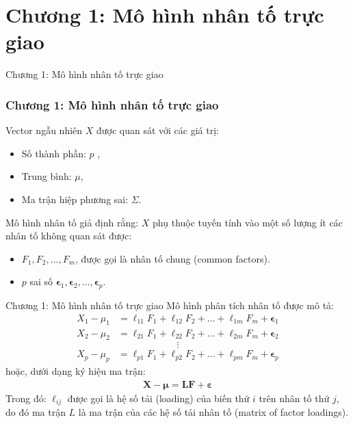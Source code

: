 \section{Chương 1: Mô hình nhân tố trực giao}
\begin{frame}{Chương 1: Mô hình nhân tố trực giao}
\frametitle{Chương 1: Mô hình nhân tố trực giao}
Vector ngẫu nhiên \(X\) được quan sát với các giá trị:
\begin{itemize}[label={-}]
\item Số thành phần: \(p\) ,
\item Trung bình: \(\mu\),
\item Ma trận hiệp phương sai: \(\Sigma\).
\end{itemize}

Mô hình nhân tố giả định rằng: \(X\) phụ thuộc tuyến tính vào một số lượng ít các nhân tố không quan sát được:
\begin{itemize}[label={-}]
\item \(F_1, F_2, \ldots, F_m\), được gọi là nhân tố chung (common factors).
\item \(p\) sai số  \(\boldsymbol{\epsilon}_1, \boldsymbol{\epsilon}_2, \ldots, \boldsymbol{\epsilon}_p\).
\end{itemize}
\end{frame}

\begin{frame}{Chương 1: Mô hình nhân tố trực giao}
Mô hình phân tích nhân tố được mô tả:
\begin{eqnarray}
X_1 - \mu_1 &= \ell_{11}F_1 + \ell_{12}F_2 + \ldots + \ell_{1m}F_m + \boldsymbol{\epsilon}_1\\
X_2 - \mu_2 &= \ell_{21}F_1 + \ell_{22}F_2 + \ldots + \ell_{2m}F_m + \boldsymbol{\epsilon}_2
\end{eqnarray}
\[\vdots\]
\begin{eqnarray}
X_p - \mu_p &= \ell_{p1}F_1 + \ell_{p2}F_2 + \ldots + \ell_{pm}F_m + \boldsymbol{\epsilon}_p
\end{eqnarray}
hoặc, dưới dạng ký hiệu ma trận:
\begin{eqnarray}
\mathbf{X} - \boldsymbol{\mu} = \mathbf{L}\mathbf{F} + \boldsymbol{\varepsilon}
\end{eqnarray}
Trong đó: \(\ell_{ij}\) được gọi là hệ số tải (loading) của biến thứ \(i\) trên nhân tố thứ \(j\), do đó ma trận \(L\) là ma trận của các hệ số tải nhân tố (matrix of factor loadings).
    
\end{frame}

